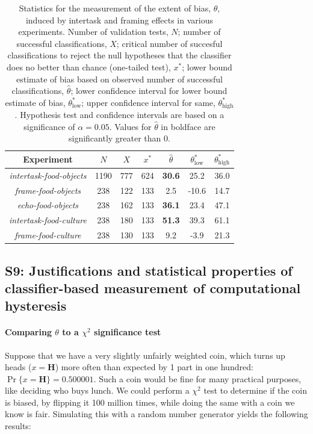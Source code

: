 \documentclass[12pt]{article}
\begin{document}
\begin{table}
\begin{center}
\begin{tabular}{c c c c c c c}
	\toprule
	Experiment & $N$ & $X$ & $x^*$ &
		$\hat{\theta}$ & $\theta^*_\mathrm{low}$ & 
		$\theta^*_\mathrm{high}$ \\
	\midrule
	\textit{intertask-food-objects} & 1190 & 777 & 624 & \textbf{30.6} 
		& 25.2 & 36.0 \\
	\textit{frame-food-objects} & 238 & 122 & 133 & 2.5 & -10.6 & 14.7 \\
	\textit{echo-food-objects} & 238 & 162 &  133 & \textbf{36.1} & 23.4 
		& 47.1  \\
	\textit{intertask-food-culture} & 238 & 180 & 133 & \textbf{51.3} & 39.3 
		& 61.1 \\
	\textit{frame-food-culture} & 238 & 130 & 133 & 9.2 & -3.9 & 21.3 \\
	\bottomrule
\end{tabular}
\caption{Statistics for the measurement of the extent of bias, $\theta$,
	induced by intertask and framing effects in various experiments.
	Number of validation tests, $N$; number of successful classifications, 
	$X$; critical number of succesful classifications to reject the null 
	hypotheses that the classifier does no better than chance 
	(one-tailed test), $x^*$; 
	lower bound estimate of bias based on observed number of successful
	classifications, $\hat{\theta}$; lower confidence interval for lower
	bound estimate of bias, $\theta^*_\mathrm{low}$; upper confidence 
	interval for same, $\theta^*_\mathrm{high}$.  Hypothesis test and 
	confidence intervals are based on a significance of $\alpha=0.05$.
	Values for $\hat{\theta}$ in boldface are significantly greater than 0.
}

\end{center}
\end{table}

\subsection*{S9: Justifications and statistical properties of classifier-based measurement of computational hysteresis}


\paragraph{Comparing $\theta$ to a $\chi^2$ significance test}
Suppose that we have a very slightly unfairly weighted coin, which turns
up heads ($x=\mathbf{H}$) more often than expected by 1 part in one hundred:
$\Pr\{x=\mathbf{H}\} = 0.500001$. Such a coin would be fine for many 
practical purposes, like deciding who buys lunch.  We could
perform a $\chi^2$ test to determine if the coin is biased, by flipping 
it 100 million times, while doing the same with a coin we know is fair.
Simulating this with a random number generator yields the following results:
\end{document}
